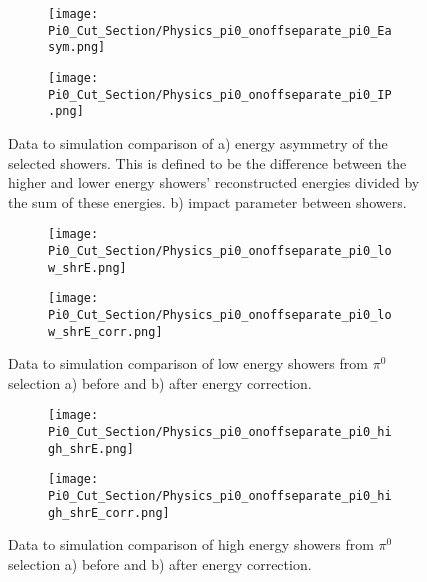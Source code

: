 \begin{figure}[H]
  \begin{subfigure}[t]{0.3\textwidth}
\texttt{[image: Pi0\_Cut\_Section/Physics\_pi0\_onoffseparate\_pi0\_Easym.png]}
  \caption{ }
  \end{subfigure} 
  \hspace{34mm}
  \begin{subfigure}[t]{0.3\textwidth}
\texttt{[image: Pi0\_Cut\_Section/Physics\_pi0\_onoffseparate\_pi0\_IP.png]}
  \caption{ }
  \end{subfigure} 
\label{fig:physics_pi0_pi0_IP}
\caption{ Data to simulation comparison of a) energy asymmetry of the selected showers. This is defined to be the difference between the higher and lower energy showers' reconstructed energies divided by the sum of these energies. b) impact parameter between showers.  }
\end{figure}

\begin{figure}[H]
  \begin{subfigure}[t]{0.3\textwidth}
\texttt{[image: Pi0\_Cut\_Section/Physics\_pi0\_onoffseparate\_pi0\_low\_shrE.png]}
  \caption{ }
  \end{subfigure} 
  \hspace{34mm}
  \begin{subfigure}[t]{0.3\textwidth}
\texttt{[image: Pi0\_Cut\_Section/Physics\_pi0\_onoffseparate\_pi0\_low\_shrE\_corr.png]}
  \caption{ }
  \end{subfigure} 
\label{fig:physics_pi0_pi0_low_e}
\caption{  Data to simulation comparison of low energy showers from $\pi^0$ selection a) before and b) after energy correction.}
\end{figure}

\begin{figure}[H]
  \begin{subfigure}[t]{0.3\textwidth}
\texttt{[image: Pi0\_Cut\_Section/Physics\_pi0\_onoffseparate\_pi0\_high\_shrE.png]}
  \caption{ }
  \end{subfigure} 
  \hspace{28mm}
  \begin{subfigure}[t]{0.3\textwidth}
\texttt{[image: Pi0\_Cut\_Section/Physics\_pi0\_onoffseparate\_pi0\_high\_shrE\_corr.png]}
  \caption{ }
  \end{subfigure} 
\label{fig:physics_pi0_pi0_e}
\caption{ Data to simulation comparison of high energy showers from $\pi^0$ selection a) before and b) after energy correction. }
\end{figure}


